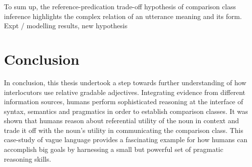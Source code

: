 To sum up, the reference-predication trade-off hypothesis of comparison class inference highlights the complex relation of an utterance meaning and its form. Expt / modelling results, new hypothesis%


\section{Conclusion}

In conclusion, this thesis undertook a step towards further understanding of how interlocutors use relative gradable adjectives. Integrating evidence from different information sources, humans perform sophisticated reasoning at the interface of syntax, semantics and pragmatics in order to establish comparison classes. It was shown that humans reason about referential utility of the noun in context and trade it off with the noun's utility in communicating the comparison class. This case-study of vague language provides a fascinating example for how humans can accomplish big goals by harnessing a small but powerful set of pragmatic reasoning skills. 